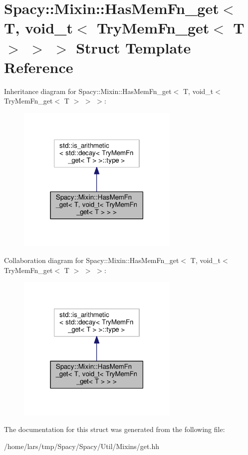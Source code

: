 \hypertarget{structSpacy_1_1Mixin_1_1HasMemFn__get_3_01T_00_01void__t_3_01TryMemFn__get_3_01T_01_4_01_4_01_4}{}\section{Spacy\+:\+:Mixin\+:\+:Has\+Mem\+Fn\+\_\+get$<$ T, void\+\_\+t$<$ Try\+Mem\+Fn\+\_\+get$<$ T $>$ $>$ $>$ Struct Template Reference}
\label{structSpacy_1_1Mixin_1_1HasMemFn__get_3_01T_00_01void__t_3_01TryMemFn__get_3_01T_01_4_01_4_01_4}


Inheritance diagram for Spacy\+:\+:Mixin\+:\+:Has\+Mem\+Fn\+\_\+get$<$ T, void\+\_\+t$<$ Try\+Mem\+Fn\+\_\+get$<$ T $>$ $>$ $>$\+:
\nopagebreak
\begin{figure}[H]
\begin{center}
\leavevmode
\includegraphics[width=219pt]{structSpacy_1_1Mixin_1_1HasMemFn__get_3_01T_00_01void__t_3_01TryMemFn__get_3_01T_01_4_01_4_01_4__inherit__graph}
\end{center}
\end{figure}


Collaboration diagram for Spacy\+:\+:Mixin\+:\+:Has\+Mem\+Fn\+\_\+get$<$ T, void\+\_\+t$<$ Try\+Mem\+Fn\+\_\+get$<$ T $>$ $>$ $>$\+:
\nopagebreak
\begin{figure}[H]
\begin{center}
\leavevmode
\includegraphics[width=219pt]{structSpacy_1_1Mixin_1_1HasMemFn__get_3_01T_00_01void__t_3_01TryMemFn__get_3_01T_01_4_01_4_01_4__coll__graph}
\end{center}
\end{figure}


The documentation for this struct was generated from the following file\+:\begin{DoxyCompactItemize}
\item 
/home/lars/tmp/\+Spacy/\+Spacy/\+Util/\+Mixins/get.\+hh\end{DoxyCompactItemize}
